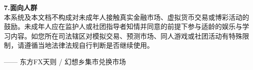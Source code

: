 \documentclass[11pt,a4paper,twoside]{article}
\begin{document}
\textbf{7.\;面向人群}\\
本系统及本文档不构成对未成年人接触真实金融市场、虚拟货币交易或博彩活动的鼓励。未成年人应在监护人或社团指导者知情并同意的前提下参与适龄的娱乐与学习内容。如您所在司法辖区对模拟交易、预测市场、同人游戏或社团活动有特殊限制，请遵循当地法律法规自行判断是否继续使用。

\vspace{0.2em}
\noindent\makebox[\linewidth][c]{\textcolor{rule}{\rule{0.62\linewidth}{0.4pt}}}
\vspace{0.4em}

\textcolor{soft}{\small —— 东方FX天则 \;/\; 幻想乡集市兑换市场}

\normalsize
\linespread{1.18}\selectfont

\label{fx:lastpage}
\end{document}
